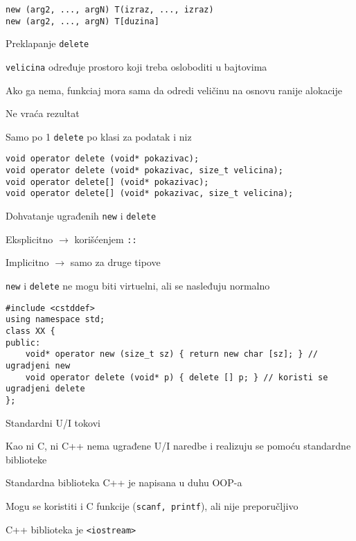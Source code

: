\documentclass{article}
\newenvironment{xitemize}{%
    
    \itemize
    \larger
}{%
    \enditemize
}
\let\olditemize\itemize
\let\endolditemize\enditemize
\renewenvironment{itemize}{%
    \smaller
    \olditemize
}{%
    \endolditemize
}
\providecommand{\inlinecode}[1]{\texttt{#1}}
\begin{document}
\begin{xitemize}
\begin{itemize}
\begin{lstlisting}
new (arg2, ..., argN) T(izraz, ..., izraz)
new (arg2, ..., argN) T[duzina]
    \end{lstlisting}
\end{itemize}
\item Preklapanje \inlinecode{delete}
\begin{itemize}
    \item \inlinecode{velicina} određuje prostoro koji treba osloboditi u bajtovima
    \item Ako ga nema, funkciaj mora sama da odredi veličinu na osnovu ranije alokacije
    \item Ne vraća rezultat
    \item Samo po 1 \inlinecode{delete} po klasi za podatak i niz
    \begin{lstlisting}
void operator delete (void* pokazivac);
void operator delete (void* pokazivac, size_t velicina);
void operator delete[] (void* pokazivac);
void operator delete[] (void* pokazivac, size_t velicina);
    \end{lstlisting}
\end{itemize}
\item Dohvatanje ugrađenih \inlinecode{new} i \inlinecode{delete}
\begin{itemize}
    \item Eksplicitno $\rightarrow$ korišćenjem \inlinecode{::}
    \item Implicitno $\rightarrow$ samo za druge tipove
    \item \inlinecode{new} i \inlinecode{delete} ne mogu biti virtuelni, ali se nasleđuju normalno
    \begin{lstlisting}
#include <cstddef>
using namespace std;
class XX {
public:
    void* operator new (size_t sz) { return new char [sz]; } // ugradjeni new
    void operator delete (void* p) { delete [] p; } // koristi se ugradjeni delete
};
    \end{lstlisting}
\end{itemize}
\item Standardni U/I tokovi
\begin{itemize}
    \item Kao ni C, ni C++ nema ugrađene U/I naredbe i realizuju se pomoću standardne biblioteke
    \item Standardna biblioteka C++ je napisana u duhu OOP-a
    \item Mogu se koristiti i C funkcije (\inlinecode{scanf, printf}), ali nije preporučljivo
    \item C++ biblioteka je \inlinecode{<iostream>}

\end{itemize}
\end{xitemize}
\end{document}
